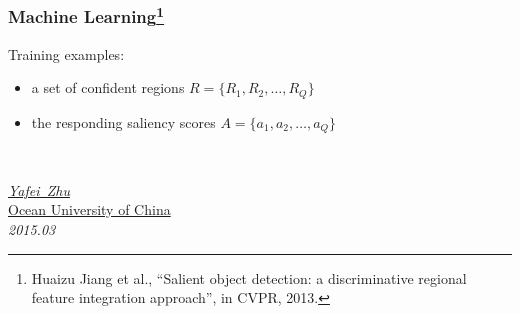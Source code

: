 \documentclass[notheorems,serif,table,compress]{beamer}  %
\newcommand\zhushadow[2][purple]{\hskip5pt\shadowbox{\color{#1}\small\kai #2\vspace{3mm}}}
\begin{document}
\begin{frame}
\frametitle{Machine Learning\footnote{Huaizu Jiang et al., ``Salient object detection: a discriminative regional feature integration approach'', in CVPR, 2013.}}
Training examples: 
\begin{itemize}
\item a set of confident regions $R = \{ R_1, R_2, \ldots, R_Q\}$
\item the responding saliency scores $A = \{a_1, a_2, \ldots, a_Q\}$
\end{itemize}
\end{frame}


\begin{frame}
  \vspace{2cm}
  \centering
  \zhushadow{\color{blue}\Huge{Thanks}}\\
  \vspace{1.5cm}
  \begin{flushright}
  \emph{\href{zhuyafei4520@163.com}{Yafei~Zhu}}\\
  \href{http://www.ouc.edu.cn}{Ocean University of China}\\
  \emph{2015.03}
  \end{flushright}  
\end{frame}

\end{document}
